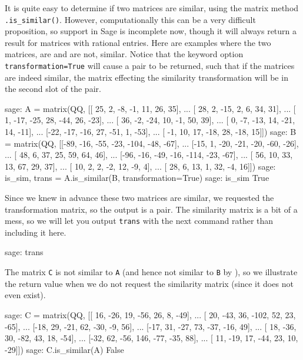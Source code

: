 It is quite easy to determine if two matrices are similar, using the matrix method \verb!.is_similar()!.  However, computationally this can be a very difficult proposition, so support in Sage is incomplete now, though it will always return a result for matrices with rational entries.  Here are examples where the two matrices, are and are not, similar.  Notice that the keyword option \verb!transformation=True! will cause a pair to be returned, such that if the matrices are indeed similar, the matrix effecting the similarity transformation will be in the second slot of the pair.
%
\begin{sageexample}
sage: A = matrix(QQ, [[ 25,   2,  -8,  -1,  11,  26,  35],
...                   [ 28,   2, -15,   2,   6,  34,  31],
...                   [  1, -17, -25,  28, -44,  26, -23],
...                   [ 36,  -2, -24,  10,  -1,  50,  39],
...                   [  0,  -7, -13,  14, -21,  14, -11],
...                   [-22, -17, -16,  27, -51,   1, -53],
...                   [  -1, 10,  17, -18,  28, -18,  15]])
sage: B = matrix(QQ, [[-89, -16, -55, -23, -104, -48, -67],
...                   [-15,   1, -20, -21,  -20, -60, -26],
...                   [ 48,   6,  37,  25,   59,  64,  46],
...                   [-96, -16, -49, -16, -114, -23, -67],
...                   [ 56,  10,  33,  13,   67,  29,  37],
...                   [ 10,   2,   2,  -2,   12,  -9,   4],
...                   [ 28,   6,  13,   1,   32,  -4,  16]])
sage: is_sim, trans = A.is_similar(B, transformation=True)
sage: is_sim
True
\end{sageexample}
%
Since we knew in advance these two matrices are similar, we requested the transformation matrix, so the output is a pair.  The similarity matrix is a bit of a mess, so we will let you output \verb?trans? with the next command rather than including it here.
%
\begin{sageexample}
sage: trans
\end{sageexample}
%
The matrix \verb!C! is not similar to \verb!A! (and hence not similar to \verb!B! by ), so we illustrate the return value when we do not request the similarity matrix (since it does not even exist).
%
\begin{sageexample}
sage: C = matrix(QQ, [[ 16, -26,  19,  -56,  26,   8, -49],
...                   [ 20, -43,  36, -102,  52,  23, -65],
...                   [-18,  29, -21,   62, -30,  -9,  56],
...                   [-17,  31, -27,   73, -37, -16,  49],
...                   [ 18, -36,  30,  -82,  43,  18, -54],
...                   [-32,  62, -56,  146, -77, -35,  88],
...                   [ 11, -19,  17,  -44,  23,  10, -29]])
sage: C.is_similar(A)
False
\end{sageexample}
%
\begin{sageverbatim}
\end{sageverbatim}
%

